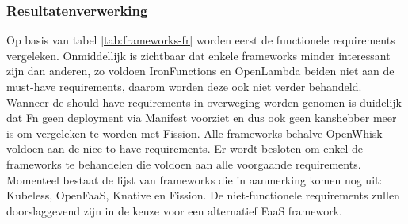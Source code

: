 \begin{table}[]
    \centering
    \caption{Vergelijking open source serverless frameworks op basis van niet-functionele requirements.}
    \label{tab:frameworks-nfr}
\end{table}

\subsubsection{Resultatenverwerking}

Op basis van tabel \ref{tab:frameworks-fr} worden eerst de functionele requirements vergeleken. Onmiddellijk is zichtbaar dat enkele frameworks minder interessant zijn dan anderen, zo voldoen IronFunctions en OpenLambda beiden niet aan de must-have requirements, daarom worden deze ook niet verder behandeld. Wanneer de should-have requirements in overweging worden genomen is duidelijk dat Fn geen deployment via Manifest voorziet en dus ook geen kanshebber meer is om vergeleken te worden met Fission. Alle frameworks behalve OpenWhisk voldoen aan de nice-to-have requirements. Er wordt besloten om enkel de frameworks te behandelen die voldoen aan alle voorgaande requirements. Momenteel bestaat de lijst van frameworks die in aanmerking komen nog uit: Kubeless, OpenFaaS, Knative en Fission. De niet-functionele requirements zullen doorslaggevend zijn in de keuze voor een alternatief FaaS framework.

